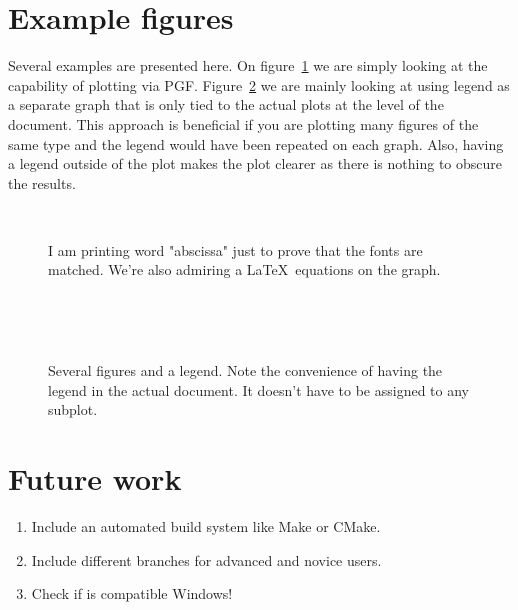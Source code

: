 \documentclass[a4paper,12pt]{article}
\begin{document}
\section{Example figures}

Several examples are presented here. On figure~\ref{fig:latex} we are simply
looking at the capability of plotting via PGF\@. Figure~\ref{fig:several} we are
mainly looking at using legend as a separate graph that is only tied to the actual
plots at the level of the document. This approach is beneficial if you are
plotting many figures of the same type and the legend would have been repeated
on each graph. Also, having a legend outside of the plot makes the plot clearer
as there is nothing to obscure the results.


\begin{figure}[t]
  \centering
  
  \\
  \caption{I am printing word "abscissa" just to prove that the fonts are
  matched. We're also admiring a \LaTeX\ equations on the graph.}
  \label{fig:latex}
\end{figure}
\begin{figure}[p]
  \begin{center}
    
    
    \\
    \vspace{5mm}
    
    
    \\
    
  \end{center}
  \caption{Several figures and a legend. Note the convenience of having the
  legend in the actual document. It doesn't have to be assigned to any subplot.}
  \label{fig:several}
\end{figure}

\section{Future work}
\begin{enumerate}
  \item Include an automated build system like Make or CMake.
  \item Include different branches for advanced and novice users.
  \item Check if is compatible Windows!
\end{enumerate}

\printbibliography
\end{document}
